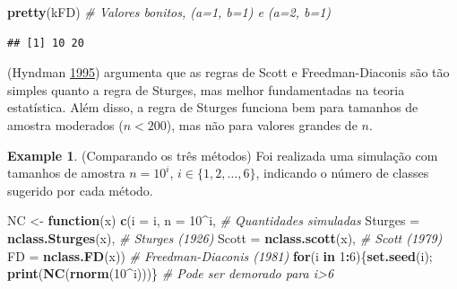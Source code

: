 \documentclass[
]{book}
\newenvironment{Shaded}{\begin{snugshade}}{\end{snugshade}}
\newcommand{\CommentTok}[1]{\textcolor[rgb]{0.56,0.35,0.01}{\textit{#1}}}
\newcommand{\ControlFlowTok}[1]{\textcolor[rgb]{0.13,0.29,0.53}{\textbf{#1}}}
\newcommand{\DataTypeTok}[1]{\textcolor[rgb]{0.13,0.29,0.53}{#1}}
\newcommand{\DecValTok}[1]{\textcolor[rgb]{0.00,0.00,0.81}{#1}}
\newcommand{\KeywordTok}[1]{\textcolor[rgb]{0.13,0.29,0.53}{\textbf{#1}}}
\newcommand{\NormalTok}[1]{#1}
\newcommand{\OperatorTok}[1]{\textcolor[rgb]{0.81,0.36,0.00}{\textbf{#1}}}
\newcommand{\StringTok}[1]{\textcolor[rgb]{0.31,0.60,0.02}{#1}}
\theoremstyle{definition}
\theoremstyle{definition}
\newtheorem{example}{Example}[chapter]
\theoremstyle{definition}
\theoremstyle{remark}
\begin{document}
\begin{Shaded}
\begin{Highlighting}[]
\KeywordTok{pretty}\NormalTok{(kFD)                     }\CommentTok{\# Valores \textquotesingle{}bonitos\textquotesingle{}, (a=1, b=1) e (a=2, b=1)}
\end{Highlighting}
\end{Shaded}

\begin{verbatim}
## [1] 10 20
\end{verbatim}

(Hyndman \protect\hyperlink{ref-hyndman1995problem}{1995}) argumenta que as regras de Scott e Freedman-Diaconis são tão simples quanto a regra de Sturges, mas melhor fundamentadas na teoria estatística. Além disso, a regra de Sturges funciona bem para tamanhos de amostra moderados (\(n < 200\)), mas não para valores grandes de \(n\).

\begin{example}
\protect\hypertarget{exm:hyndman}{}{\label{exm:hyndman} }(Comparando os três métodos) Foi realizada uma simulação com tamanhos de amostra \(n=10^{i}\), \(i \in \{1, 2, \ldots, 6 \}\), indicando o número de classes sugerido por cada método.
\end{example}

\begin{Shaded}
\begin{Highlighting}[]
\NormalTok{NC \textless{}{-}}\StringTok{ }\ControlFlowTok{function}\NormalTok{(x) }\KeywordTok{c}\NormalTok{(}\DataTypeTok{i =}\NormalTok{ i, }\DataTypeTok{n =} \DecValTok{10}\OperatorTok{\^{}}\NormalTok{i,                }\CommentTok{\# Quantidades simuladas}
                    \DataTypeTok{Sturges =} \KeywordTok{nclass.Sturges}\NormalTok{(x),     }\CommentTok{\# Sturges (1926)}
                    \DataTypeTok{Scott =} \KeywordTok{nclass.scott}\NormalTok{(x),         }\CommentTok{\# Scott (1979)}
                    \DataTypeTok{FD =} \KeywordTok{nclass.FD}\NormalTok{(x))               }\CommentTok{\# Freedman{-}Diaconis (1981)}
\ControlFlowTok{for}\NormalTok{(i }\ControlFlowTok{in} \DecValTok{1}\OperatorTok{:}\DecValTok{6}\NormalTok{)\{}\KeywordTok{set.seed}\NormalTok{(i); }\KeywordTok{print}\NormalTok{(}\KeywordTok{NC}\NormalTok{(}\KeywordTok{rnorm}\NormalTok{(}\DecValTok{10}\OperatorTok{\^{}}\NormalTok{i)))\}  }\CommentTok{\# Pode ser demorado para i\textgreater{}6}
\end{Highlighting}
\end{Shaded}
\end{document}
